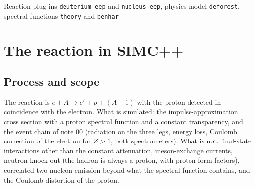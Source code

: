 \documentclass{simcnote}
\begin{document}
%
  {Reaction plug-ins \texttt{deuterium\_eep} and \texttt{nucleus\_eep}, physics model \texttt{deforest}, spectral
   functions \texttt{theory} and \texttt{benhar}}
\simcnotemaketitle
{}
\simcnotetoc

\section{The reaction in SIMC++}

\subsection{Process and scope}
The reaction is $e + A \to e' + p + (A-1)$ with the proton detected in coincidence with the electron. What is simulated:
the impulse-approximation cross section with a proton spectral function and a constant transparency, and the event
chain of note 00 (radiation on the three legs, energy loss, Coulomb correction of the electron for $Z>1$, both
spectrometers). What is not: final-state interactions other than the constant attenuation, meson-exchange currents,
neutron knock-out (the hadron is always a proton, with proton form factors), correlated two-nucleon emission beyond what
the spectral function contains, and the Coulomb distortion of the proton.
\end{document}
